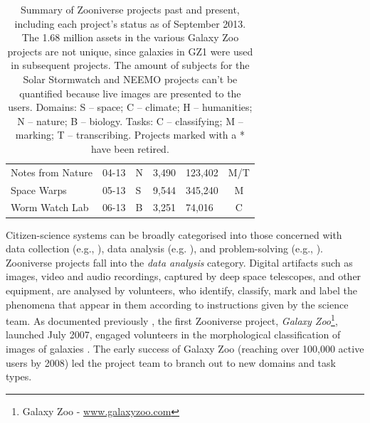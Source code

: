 \documentclass{sigchi}
\begin{document}
\begin{table}
\begin{center}
\begin{tabular}{p{2.2cm}lp{0.7cm}llc}
Notes from Nature & 04-13 & N & 3,490 & 123,402 & M/T \\
Space Warps & 05-13 & S & 9,544 & 345,240 & M \\
Worm Watch Lab & 06-13 & B & 3,251 & 74,016 & C \\
\hline
\end{tabular}
\normalsize
\label{table:project-summary}
\caption{Summary of Zooniverse projects past and present, including each project's status as of September 2013.  The 1.68 million assets in the various Galaxy Zoo projects are not unique, since galaxies in GZ1 were used in subsequent projects. The amount of subjects for the Solar Stormwatch and NEEMO projects can't be quantified because live images are presented to the users. Domains: S -- space; C -- climate; H -- humanities; N -- nature; B -- biology. Tasks: C -- classifying; M -- marking; T -- transcribing. Projects marked with a * have been retired.}
\end{center}
\end{table}

Citizen-science systems can be broadly categorised into those concerned with data collection (e.g., \cite{zook2010volunteered,wood2011ebird}), data analysis (e.g. \cite{westphal2005stardust,heinzelman2010crowdsourcing}), and problem-solving (e.g., \cite{khatib2011algorithm,cordero2012rna}).  Zooniverse projects fall into the \emph{data analysis} category.  Digital artifacts such as images, video and audio recordings, captured by deep space telescopes, and other equipment, are analysed by volunteers, who identify, classify, mark and label the phenomena that appear in them according to instructions given by the science team. As documented previously \cite{fortson2011galaxy}, the first Zooniverse project, \emph{Galaxy Zoo}\footnote{Galaxy Zoo - \url{www.galaxyzoo.com}}, launched July 2007, engaged volunteers in the morphological classification of images of galaxies \cite{lintott2008galaxy}. The early success of Galaxy Zoo (reaching over 100,000 active users by 2008) led the project team to branch out to new domains and task types. 
\end{document}
